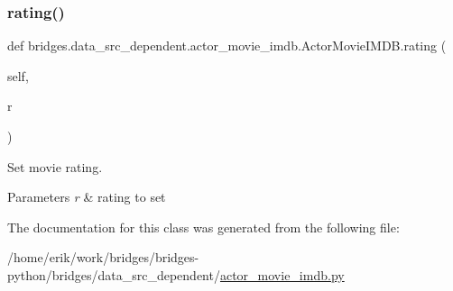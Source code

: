 \subsubsection{\texorpdfstring{rating()}{rating()}\hspace{0.1cm}{\footnotesize\ttfamily [2/2]}}
{\footnotesize\ttfamily def bridges.\+data\+\_\+src\+\_\+dependent.\+actor\+\_\+movie\+\_\+imdb.\+Actor\+Movie\+I\+M\+D\+B.\+rating (\begin{DoxyParamCaption}\item[{}]{self,  }\item[{}]{r }\end{DoxyParamCaption})}



Set movie rating. 


\begin{DoxyParams}{Parameters}
{\em r} & rating to set \\
\hline
\end{DoxyParams}


The documentation for this class was generated from the following file\+:\begin{DoxyCompactItemize}
\item 
/home/erik/work/bridges/bridges-\/python/bridges/data\+\_\+src\+\_\+dependent/\hyperlink{actor__movie__imdb_8py}{actor\+\_\+movie\+\_\+imdb.\+py}\end{DoxyCompactItemize}
